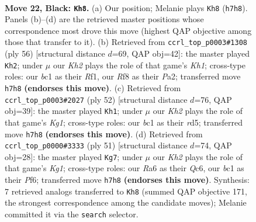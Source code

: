 \documentclass[11pt]{article}
\begin{document}
\clearpage

\begin{figure}[p]\centering
\begin{subfigure}{0.46\textwidth}\centering
\resizebox{\linewidth}{!}{%
\newchessgame
\chessboard[
  setfen={5r2/2p1qp1k/r6p/2p1p1p1/2P1P1P1/3P3Q/5K2/1NB2R2 b - - 1 22},
  showmover=false,
  pgfstyle=straightmove, color=movearrow, markmove={h7-h8}
]}
\caption{}
\end{subfigure}\hfill
\begin{subfigure}{0.46\textwidth}\centering
\resizebox{\linewidth}{!}{%
\newchessgame
\chessboard[
  setfen={2r3k1/3q1pp1/pB5p/1p1Pp3/4P3/bP1Q3P/P5P1/5R1K w - - 0 29},
  showmover=false,
  pgfstyle=straightmove, color=movearrow, markmove={h1-h2}
]}
\caption{}
\end{subfigure}
\\[4pt]
\begin{subfigure}{0.46\textwidth}\centering
\resizebox{\linewidth}{!}{%
\newchessgame
\chessboard[
  setfen={3r2k1/q4pp1/1p5p/3r4/PR1P4/2Q2P1P/6P1/R5K1 w - - 1 27},
  showmover=false,
  pgfstyle=straightmove, color=movearrow, markmove={g1-h1}
]}
\caption{}
\end{subfigure}\hfill
\begin{subfigure}{0.46\textwidth}\centering
\resizebox{\linewidth}{!}{%
\newchessgame
\chessboard[
  setfen={6k1/5p2/2q2p1p/1prp4/p7/P2QP1P1/1P3P1P/3R2K1 b - - 2 26},
  showmover=false,
  pgfstyle=straightmove, color=movearrow, markmove={g8-g7}
]}
\caption{}
\end{subfigure}
\caption{\textbf{Move 22, Black: \texttt{Kh8}.} (a) Our position; Melanie plays \texttt{Kh8} (\texttt{h7h8}). Panels (b)--(d) are the retrieved master positions whose correspondence most drove this move (highest QAP objective among those that transfer to it). (b) Retrieved from \texttt{ccrl\_top\_p0003\#1308} (ply 56) [structural distance $d$=69, QAP obj=42]: the master played \texttt{Kh2}; under $\mu$ our \emph{Kh2} plays the role of that game's \emph{Kh1}; cross-type roles: our \emph{b}c1 as their \emph{R}f1, our \emph{R}f8 as their \emph{P}a2; transferred move \texttt{h7h8} \textbf{(endorses this move)}. (c) Retrieved from \texttt{ccrl\_top\_p0003\#2027} (ply 52) [structural distance $d$=76, QAP obj=39]: the master played \texttt{Kh1}; under $\mu$ our \emph{Kh2} plays the role of that game's \emph{Kg1}; cross-type roles: our \emph{b}c1 as their \emph{r}d5; transferred move \texttt{h7h8} \textbf{(endorses this move)}. (d) Retrieved from \texttt{ccrl\_top\_p0000\#3333} (ply 51) [structural distance $d$=74, QAP obj=28]: the master played \texttt{Kg7}; under $\mu$ our \emph{Kh2} plays the role of that game's \emph{Kg1}; cross-type roles: our \emph{R}a6 as their \emph{Q}c6, our \emph{b}c1 as their \emph{P}f6; transferred move \texttt{h7h8} \textbf{(endorses this move)}. Synthesis: 7 retrieved analogs transferred to \texttt{Kh8} (summed QAP objective 171, the strongest correspondence among the candidate moves); Melanie committed it via the \texttt{search} selector.}
\label{fig:thought-m43}
\end{figure}
\end{document}
